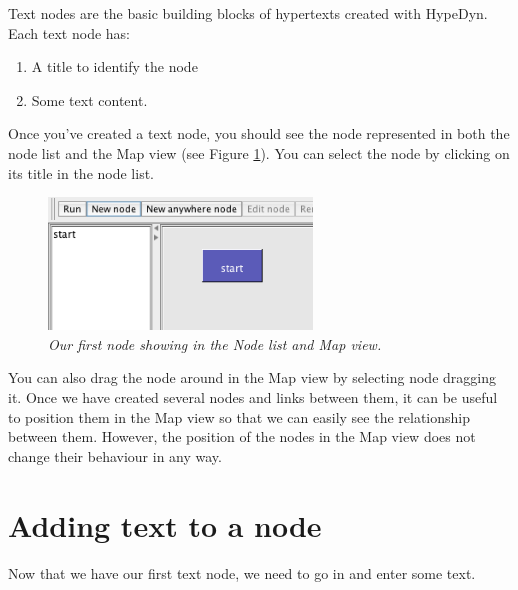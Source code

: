 \documentclass{article}
\begin{document}
Text nodes are the basic building blocks of hypertexts created with HypeDyn.
Each text node has: 
\begin{enumerate}
  \item A title to identify the node
  \item Some text content.
\end{enumerate}

Once you've created a text node, you should see the node represented in both the
node list and the Map view (see Figure \ref{fig:first_node}). You can select the
node by clicking on its title in the node list.
 
\begin{figure}[ht]
  \centering \includegraphics[width=7cm]{images/hypedyn-tutorial-1-figure-4}
  \caption{\textit{Our first node showing in the Node list and Map view.}}
  \label{fig:first_node}
\end{figure} 

You can also drag the node around in the Map view by selecting node dragging
it. Once we have created several nodes and links between them, it can be useful
to position them in the Map view so that we can easily see the relationship
between them. However, the position of the nodes in the Map view does
not change their behaviour in any way.

\section{Adding text to a node}

Now that we have our first text node, we need to go in and enter some text.
\end{document}
